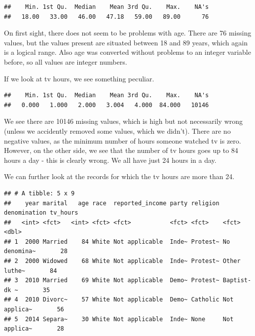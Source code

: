 \documentclass[]{tufte-book}
\newenvironment{Shaded}{}{}
\newcommand{\DecValTok}[1]{\textcolor[rgb]{0.25,0.63,0.44}{#1}}
\newcommand{\KeywordTok}[1]{\textcolor[rgb]{0.00,0.44,0.13}{\textbf{#1}}}
\newcommand{\NormalTok}[1]{#1}
\newcommand{\OperatorTok}[1]{\textcolor[rgb]{0.40,0.40,0.40}{#1}}
\newcommand{\StringTok}[1]{\textcolor[rgb]{0.25,0.44,0.63}{#1}}
\begin{document}
\begin{verbatim}
##    Min. 1st Qu.  Median    Mean 3rd Qu.    Max.    NA's 
##   18.00   33.00   46.00   47.18   59.00   89.00      76
\end{verbatim}

On first sight, there does not seem to be problems with age. There are 76 missing values, but the values present are situated between 18 and 89 years, which again is a logical range. Also age was converted without problems to an integer variable before, so all values are integer numbers.

If we look at tv hours, we see something peculiar.

\begin{Shaded}
\end{Shaded}

\begin{verbatim}
##    Min. 1st Qu.  Median    Mean 3rd Qu.    Max.    NA's 
##   0.000   1.000   2.000   3.004   4.000  84.000   10146
\end{verbatim}

We see there are 10146 missing values, which is high but not necessarily wrong (unless we accidently removed some values, which we didn't). There are no negative values, as the minimum number of hours someone watched tv is zero. However, on the other side, we see that the number of tv hours goes up to 84 hours a day - this is clearly wrong. We all have just 24 hours in a day.

We can further look at the records for which the tv hours are more than 24.

\begin{Shaded}
\end{Shaded}

\begin{verbatim}
## # A tibble: 5 x 9
##    year marital   age race  reported_income party religion denomination tv_hours
##   <int> <fct>   <int> <fct> <fct>           <fct> <fct>    <fct>           <dbl>
## 1  2000 Married    84 White Not applicable  Inde~ Protest~ No denomina~       28
## 2  2000 Widowed    68 White Not applicable  Inde~ Protest~ Other luthe~       84
## 3  2010 Married    69 White Not applicable  Demo~ Protest~ Baptist-dk ~       35
## 4  2010 Divorc~    57 White Not applicable  Demo~ Catholic Not applica~       56
## 5  2014 Separa~    30 White Not applicable  Inde~ None     Not applica~       28
\end{verbatim}
\end{document}
